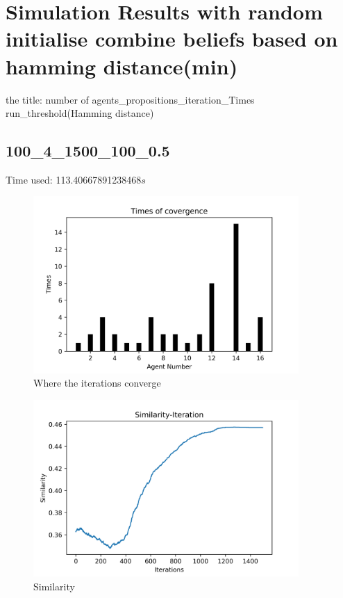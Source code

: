 \documentclass[a4paper,12pt]{article}
\begin{document}
\section{Simulation Results with random initialise combine beliefs based on hamming distance(min)}
the title: number of agents\_propositions\_iteration\_Times run\_threshold(Hamming distance)
\graphicspath{{figsMaxHamm/}}

    \subsection{100\_4\_1500\_100\_0.5}
Time used: 113.40667891238468${s}$
\begin{figure}[H]
	\centering
	\includegraphics[width=0.9\textwidth]{agt50_4_1500_50_8}
	\caption{Where the iterations converge}\label{agt50_4_1500_100_8_mh}
\end{figure}
%
\begin{figure}[H]
	\centering
	\includegraphics[width=0.9\textwidth]{Sim50_4_1500_50_8}
	\caption{Similarity}\label{Sim50_4_1500_50_8_mh}
\end{figure}
\end{document}
